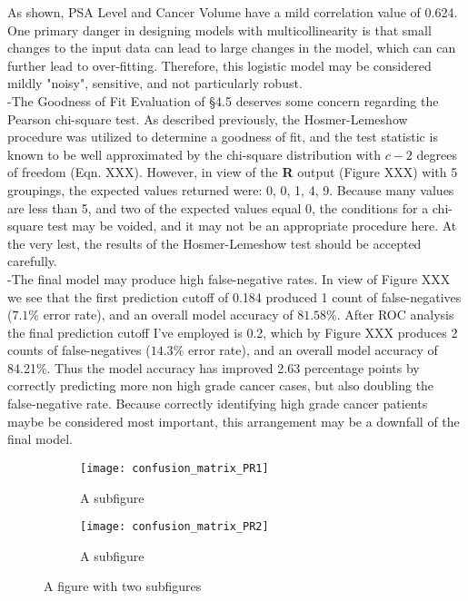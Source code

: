 As shown, PSA Level and Cancer Volume have a mild correlation value of 0.624. One primary danger in designing models with multicollinearity is that small changes to the input data can lead to large changes in the model, which can can further lead to over-fitting. Therefore, this logistic model may be considered mildly "noisy", sensitive, and not particularly robust. \\

-The Goodness of Fit Evaluation of \S4.5 deserves some concern regarding the Pearson chi-square test. As described previously, the Hosmer-Lemeshow procedure was utilized to determine a goodness of fit, and the test statistic is known to be well approximated by the chi-square distribution with \(c-2\) degrees of freedom (Eqn. XXX). However, in view of the \textbf{R} output (Figure XXX) with 5 groupings, the expected values returned were: 0, 0, 1, 4, 9. Because many values are less than 5, and two of the expected values equal 0, the conditions for a chi-square test may be voided, and it may not be an appropriate procedure here. At the very lest, the results of the Hosmer-Lemeshow test should be accepted carefully. \\

-The final model may produce high false-negative rates. In view of Figure XXX we see that the first prediction cutoff of 0.184 produced 1 count of false-negatives (\(7.1\%\) error rate), and an overall model accuracy of \(81.58\%\). After ROC analysis the final prediction cutoff I've employed is 0.2, which by Figure XXX produces 2 counts of false-negatives (\(14.3\%\) error rate), and an overall model accuracy of 84.21\%. Thus the model accuracy has improved 2.63 percentage points by correctly predicting more non high grade cancer cases, but also doubling the false-negative rate. Because correctly identifying high grade cancer patients maybe be considered most important, this arrangement may be a downfall of the final model.

\begin{figure}[H]
\centering
\begin{subfigure}{.5\textwidth}
  \centering
  \texttt{[image: confusion\_matrix\_PR1]}
  \caption{A subfigure}
  \label{fig:sub1}
\end{subfigure}%
\begin{subfigure}{.5\textwidth}
  \centering
  \texttt{[image: confusion\_matrix\_PR2]}
  \caption{A subfigure}
  \label{fig:sub2}
\end{subfigure}
\caption{A figure with two subfigures}
\label{fig:test}
\end{figure}

